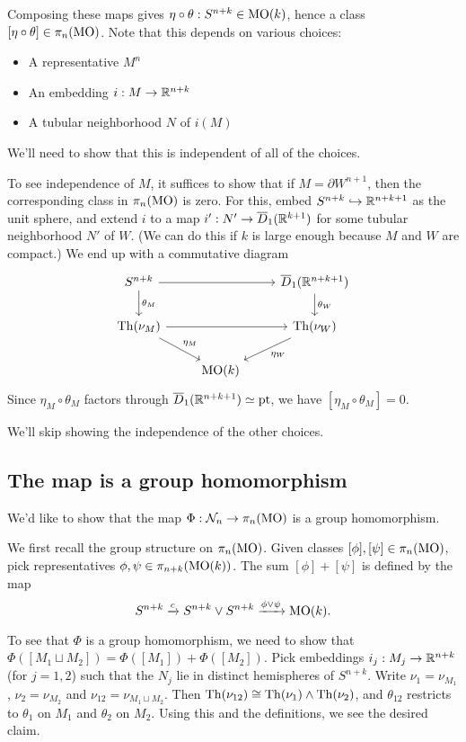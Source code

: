 \documentclass{article}
\begin{document}
Composing these maps gives $\eta \circ \theta: S^{n+k} \in \mathrm{MO}(k)$, hence a class $[\eta \circ \theta] \in \pi_n(\mathrm{MO})$.
Note that this depends on various choices:
\begin{itemize}
	\item A representative $M^n$
	\item An embedding $i: M \to \mathbb{R}^{n+k}$
	\item A tubular neighborhood $N$ of $i(M)$
\end{itemize}
We'll need to show that this is independent of all of the choices.

To see independence of $M$, it suffices to show that if $M = \partial W^{n+1}$, then the corresponding class in $\pi_n(\mathrm{MO})$ is zero.
For this, embed $S^{n+k} \hookrightarrow \mathbb{R}^{n+k+1}$ as the unit sphere, and extend $i$ to a map $i': N' \to \overline{D}_1(\mathbb{R}^{k+1})$ for some tubular neighborhood $N'$ of $W$.
(We can do this if $k$ is large enough because $M$ and $W$ are compact.)
We end up with a commutative diagram 
\[
	\begin{tikzcd}
		S^{n+k} \ar[rr] \dar["\theta_M"] & & \ol{D}_1(\RR^{n+k+1}) \dar["\theta_W"] \\
		\Th(\nu_M) \ar[rr] \ar[dr, "\eta_M"] & & \Th(\nu_W) \ar[dl, "\eta_W"] \\
		 & \MO(k) &
	\end{tikzcd}
\]
Since $\eta_M \circ \theta_M$ factors through $\overline{D}_1(\mathbb{R}^{n+k+1}) \simeq \mathrm{pt}$, we have $[\eta_M \circ \theta_M] = 0$.

We'll skip showing the independence of the other choices.

\subsection{The map is a group homomorphism}

We'd like to show that the map $\Phi: \mathcal{N}_n \to \pi_n(\mathrm{MO})$ is a group homomorphism.

We first recall the group structure on $\pi_n(\mathrm{MO})$.
Given classes $[\phi], [\psi] \in \pi_n(\mathrm{MO})$, pick representatives $\phi, \psi \in \pi_{n+k}(\mathrm{MO}(k))$.
The sum $[\phi] + [\psi]$ is defined by the map
\[
	S^{n+k} \xrightarrow{c} S^{n+k} \vee S^{n+k} \xrightarrow{\phi \vee \psi} \mathrm{MO}(k).
\]

To see that $\Phi$ is a group homomorphism, we need to show that $\Phi([M_1 \sqcup M_2]) = \Phi([M_1]) + \Phi([M_2])$.
Pick embeddings $i_j: M_j \to \mathbb{R}^{n+k}$ (for $j = 1, 2$) such that the $N_j$ lie in distinct hemispheres of $S^{n+k}$.
Write $\nu_1 = \nu_{M_1}$, $\nu_2 = \nu_{M_2}$ and $\nu_{12} = \nu_{M_1 \sqcup M_2}$.
Then $\operatorname{Th}(\nu_{12}) \cong \operatorname{Th}(\nu_1) \wedge \operatorname{Th}(\nu_2)$, and $\theta_{12}$ restricts to $\theta_1$ on $M_1$ and $\theta_2$ on $M_2$.
Using this and the definitions, we see the desired claim.
\end{document}
